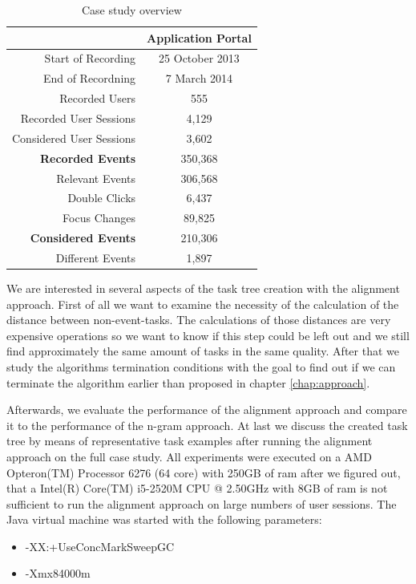 \begin{table}
	\centering
	 \begin{tabular}{|r|c|}
		   \hline
		   & \textbf{Application Portal }\\
		     \hline
		       Start of Recording & 25 October 2013 \\
		       End of Recordning & 7 March 2014 \\
		       Recorded Users & 555 \\
		       Recorded User Sessions & 4,129 \\
		       Considered User Sessions & 3,602 \\
		       \hline
		         \textbf{Recorded Events} & 350,368 \\
		         Relevant Events & 306,568 \\
		         Double Clicks & 6,437 \\
		         Focus Changes & 89,825 \\
		         \hline
			   \textbf{Considered Events} & 210,306 \\
			   Different Events & 1,897 \\
			   \hline
			    \end{tabular}
			    \caption{Case study overview}
	\label{tab:casestudy2}
\end{table}

We are interested in several aspects of the task tree creation with the alignment approach.
First of all we want to examine the necessity of the calculation of the distance between non-event-tasks.
The calculations of those distances are very expensive operations so we want to know if this step could be left out and we still find approximately the same amount of tasks in the same quality.
After that we study the algorithms termination conditions with the goal to find out if we can terminate the algorithm earlier than proposed in chapter \ref{chap:approach}.

Afterwards, we evaluate the performance of the alignment approach and compare it to the performance of the n-gram approach.
At last we discuss the created task tree by means of representative task examples after running the alignment approach on the full case study.
All experiments were executed on a AMD Opteron(TM) Processor 6276 (64 core) with 250GB of ram after we figured out, that a Intel(R) Core(TM) i5-2520M CPU @ 2.50GHz with 8GB of ram is not sufficient to run the alignment approach on large numbers of user sessions.
The Java virtual machine was started with the following parameters:
\begin{itemize}
	\item -XX:+UseConcMarkSweepGC
	\item -Xmx84000m
\end{itemize}

